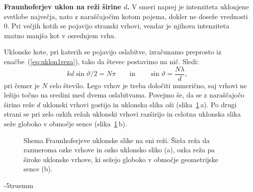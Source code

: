 \begin{example}{\bf Fraunhoferjev uklon na reži širine $d$.}
V smeri naprej je intenziteta uklonjene svetlobe največja, nato z naraščajočim
kotom pojema, dokler ne doseže vrednosti 0. Pri večjih kotih se pojavijo stranski
vrhovi, vendar je njihova intenziteta znatno manjša kot v osrednjem vrhu. 

Uklonske kote, pri 
katerih se pojavijo oslabitve, izračunamo preprosto iz enačbe~(\ref{eq:uklon1reza}), tako da
števec postavimo na nič. Sledi:
\begin{equation}
kd \sin \vartheta/2 = N\pi \qquad \mathrm{in} \qquad \sin \vartheta = \frac{N\lambda}{d},
\label{eq:05_24}
\end{equation}
pri čemer je $N$ celo število. Lego vrhov je treba določiti numerično, saj 
vrhovi ne ležijo točno na sredini med dvema oslabitvama. Povejmo še, da 
se z naraščajočo širino reže $d$ uklonski vrhovi gostijo in uklonska slika oži
(slika~\ref{fig:05_Rezad}\,a). Po drugi strani se pri zelo ozkih režah uklonski 
vrhovi razširijo in celotna uklonska slika seže globoko v območje sence 
(slika~\ref{fig:05_Rezad}\,b).
\begin{figure}[ht]
\centering
\def\svgwidth{110truemm} 

\caption{Shema Fraunhoferjeve uklonske slike na eni reži. 
Širša reža da razmeroma ozke vrhove in ozko
uklonsko sliko (a), ozka reža pa široke uklonske vrhove, ki sežejo globoko v območje 
geometrijske sence (b).}
\label{fig:05_Rezad}
\end{figure}
\vglue-5truemm

\end{example}

